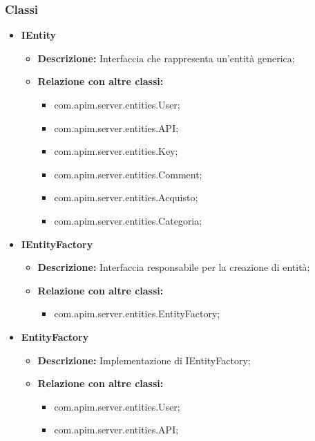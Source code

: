 {{{{{{        \subsubsection{Classi}
        \begin{itemize} \itemsep1pt
          \item \textbf{IEntity}
          \begin{itemize}
            \item \textbf{Descrizione:} Interfaccia che rappresenta un'entità generica;
            \item \textbf{Relazione con altre classi:}
            \begin{itemize}
              \item com.apim.server.entities.User;
              \item com.apim.server.entities.API;
              \item com.apim.server.entities.Key;
              \item com.apim.server.entities.Comment;
              \item com.apim.server.entities.Acquisto;
              \item com.apim.server.entities.Categoria;
            \end{itemize}
          \end{itemize}
          \item \textbf{IEntityFactory}
          \begin{itemize}
            \item \textbf{Descrizione:} Interfaccia responsabile per la creazione di entità;
            \item \textbf{Relazione con altre classi:}
            \begin{itemize}
              \item com.apim.server.entities.EntityFactory;
            \end{itemize}
          \end{itemize}
          \item \textbf{EntityFactory}
          \begin{itemize}
            \item \textbf{Descrizione:} Implementazione di IEntityFactory;
            \item \textbf{Relazione con altre classi:}
            \begin{itemize}
              \item com.apim.server.entities.User;
              \item com.apim.server.entities.API;

\end{itemize}
\end{itemize}
\end{itemize}}}}}}}
